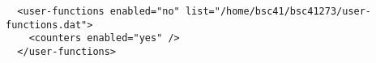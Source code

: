\begin{verbatim}
  <user-functions enabled="no" list="/home/bsc41/bsc41273/user-functions.dat">
    <counters enabled="yes" />
  </user-functions>
\end{verbatim}

